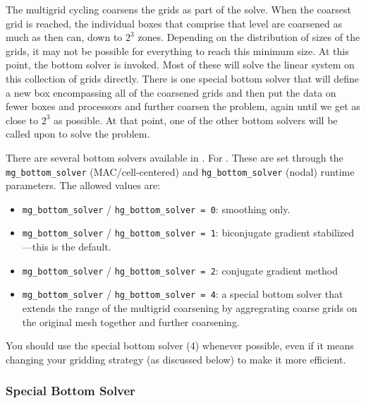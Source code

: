 The multigrid cycling coarsens the grids as part of the solve.  When 
the coarsest grid is reached, the individual boxes that comprise that
level are coarsened as much as then can, down to $2^3$ zones.  Depending
on the distribution of sizes of the grids, it may not be possible for
everything to reach this minimum size.  At this point, the bottom
solver is invoked.  Most of these will solve the linear system
on this collection of grids directly.  There is one special bottom
solver that will define a new box encompassing all of the coarsened
grids and then put the data on fewer boxes and processors and further
coarsen the problem, again until we get as close to $2^3$ as possible.
At that point, one of the other bottom solvers will be called upon
to solve the problem.

There are several bottom solvers available in \boxlib.  For \maestro.
These are set through the {\tt mg\_bottom\_solver} (MAC/cell-centered)
and {\tt hg\_bottom\_solver} (nodal) runtime parameters.
The allowed values are:
\begin{itemize}

\item {\tt mg\_bottom\_solver} / {\tt hg\_bottom\_solver = 0}: smoothing only.

\item {\tt mg\_bottom\_solver} / {\tt hg\_bottom\_solver = 1}: biconjugate
  gradient stabilized---this is the default.

\item {\tt mg\_bottom\_solver} / {\tt hg\_bottom\_solver = 2}: conjugate
  gradient method

\item {\tt mg\_bottom\_solver} / {\tt hg\_bottom\_solver = 4}: a special 
  bottom solver that extends the range of the multigrid coarsening
  by aggregrating coarse grids on the original mesh together and
  further coarsening.

\end{itemize}

You should use the special bottom solver (4) whenever possible, even
if it means changing your gridding strategy (as discussed below) to 
make it more efficient.


\subsubsection{Special Bottom Solver}

